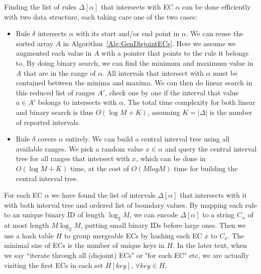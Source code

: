 Finding the list of rules $\Delta[\alpha]$ that intersects with EC $\alpha$ can be done
efficiently with two data structure,
each taking care one of the two cases\cite{FindIntersectionWiki}:
\begin{itemize}
\item Rule $\delta$ intersects $\alpha$ with its start and/or end point in $\alpha$.
        We can reuse the sorted array $A$ in Algorithm~\ref{Alg:GenDisjointECs}.
        Here we assume we augmented each value in $A$ with a pointer that points to
        the rule it belongs to.
        By doing binary search, we can find the minimum and maximum value in $A$ that
        are in the range of $\alpha$.
        All intervals that intersect with $\alpha$ must be contained between
        the minima and maxima.
        We can then do linear search in this reduced list of ranges $A'$,
        check one by one if the interval that value $a\in A'$ belongs to
        intersects with $\alpha$.
        The total time complexity for both linear and binary search is thus $O(\log M + K)$,
        assuming $K=|\Delta|$ is the number of reported intervals.
\item Rule $\delta$ covers $\alpha$ entirely. We can build
        a central interval tree\cite{ComputationalGeometryBook} using all available ranges.
        We pick a random value $x \in \alpha$ and query the central interval tree for
        all ranges that intersect with $x$, which can be done in $O(\log M + K)$ time,
        at the cost of $O(M log M)$ time for building the central interval tree. 
\end{itemize}

For each EC $\alpha$ we have found the list of intervals $\Delta[\alpha]$
that intersects with it with both interval tree and ordered list of boundary values.
By mapping each rule to an unique binary ID of length $\log_2 M$,
we can encode $\Delta[\alpha]$ to a string $C_\alpha$ of at most length $M\log_2 M$, putting
small binary IDs before large ones.
Then we use a hash table $H$ to group mergeable ECs by hashing each EC $x$ to $C_x$.
The minimal size of ECs is the number of unique keys in $H$.
In the later text, when we say ``iterate through all (disjoint) ECs" or "for each EC" etc,
we are actually visiting the first ECs in each set $H[key]$, $\forall key \in H$.


